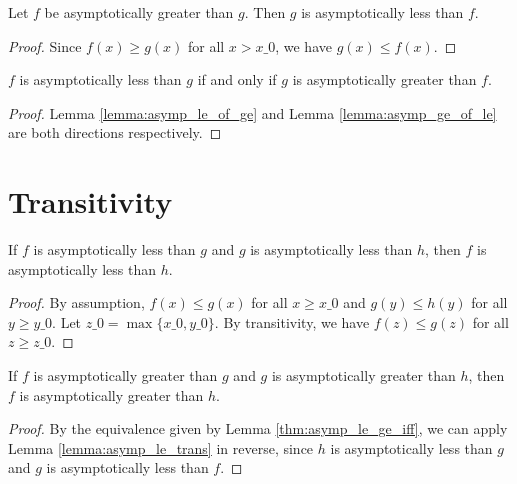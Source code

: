 \begin{lemma}
    \label{lemma:asymp_ge_of_le}
    \leanok
    Let $f$ be asymptotically greater than $g$. Then $g$ is asymptotically
    less than $f$.
\end{lemma}

\begin{proof}
    \leanok
    Since $f(x) \ge g(x)$ for all $x > x\_0$, we have $g(x) \le f(x)$.
\end{proof}

\begin{theorem}
    \label{thm:asymp_le_ge_iff}
    \leanok
    $f$ is asymptotically less than $g$ if and only if $g$ is asymptotically
    greater than $f$.
\end{theorem}

\begin{proof}
    \leanok
    Lemma \ref{lemma:asymp_le_of_ge} and Lemma \ref{lemma:asymp_ge_of_le} are both directions
    respectively.
\end{proof}


\section{Transitivity}

\begin{lemma}
    \label{lemma:asymp_le_trans}
    \leanok
    If $f$ is asymptotically less than $g$ and $g$ is asymptotically less than $h$,
    then $f$ is asymptotically less than $h$.
\end{lemma}

\begin{proof}
    \leanok
    By assumption, $f(x) \le g(x)$ for all $x \ge x\_0$ and $g(y) \le h(y)$ for all
    $y \ge y\_0$. Let $z\_0 = \max \{ x\_0, y\_0 \}$. By transitivity, we have 
    $f(z) \le g(z)$ for all $z \ge z\_0$.
\end{proof}

\begin{lemma}
    \label{lemma:asymp_ge_trans}
    \leanok
    If $f$ is asymptotically greater than $g$ and $g$ is asymptotically greater than $h$,
    then $f$ is asymptotically greater than $h$.
\end{lemma}

\begin{proof}
    \leanok
    By the equivalence given by Lemma \ref{thm:asymp_le_ge_iff}, we can apply
    Lemma \ref{lemma:asymp_le_trans} in reverse, since $h$ is asymptotically less than
    $g$ and $g$ is asymptotically less than $f$.
\end{proof}


